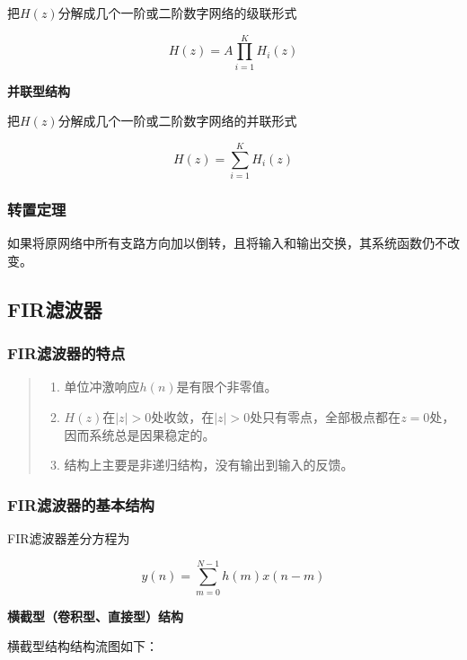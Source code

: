 \documentclass[cn, hazy, blue, normal, 12pt]{elegantnote}
\begin{document}
把$H(z)$分解成几个一阶或二阶数字网络的级联形式

\begin{equation}
    H(z)=A\prod_{i=1}^{K}H_i(z)
\end{equation}

\textbf{并联型结构}

把$H(z)$分解成几个一阶或二阶数字网络的并联形式

\begin{equation}
    H(z)=\sum_{i=1}^{K}H_i(z)
\end{equation}

\subsubsection{转置定理}

如果将原网络中所有支路方向加以倒转，且将输入和输出交换，其系统函数仍不改变。

\subsection{FIR滤波器}

\subsubsection{FIR滤波器的特点}

\begin{quote}
\begin{enumerate}
    \item 单位冲激响应$h(n)$是有限个非零值。
    \item $H(z)$在$|z|>0$处收敛，在$|z|>0$处只有零点，全部极点都在$z=0$处，因而系统总是因果稳定的。
    \item 结构上主要是非递归结构，没有输出到输入的反馈。
\end{enumerate}
\end{quote}

\subsubsection{FIR滤波器的基本结构}

FIR滤波器差分方程为

\begin{equation}
    y(n)=\sum_{m=0}^{N-1}h(m)x(n-m)
\end{equation}

\textbf{横截型（卷积型、直接型）结构}

横截型结构结构流图如下：
\end{document}
